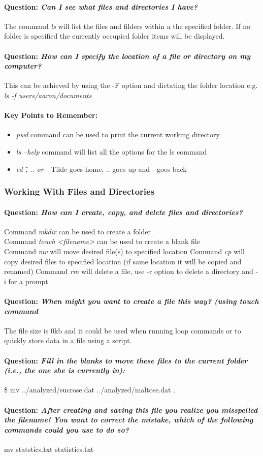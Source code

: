 \documentclass[12pt]{article}
\newcommand{\remember}{\paragraph{Key Points to Remember:}}
\newcommand{\question}[1]{\paragraph{Question: {\textnormal{\textit{#1}}} ~\\}}
\begin{document}
\question{Can I see what files and directories I have?}
The command \textit{ls} will list the files and filders within a the specified folder. If no folder is specified the currently occupied folder items will be displayed.

\question{How can I specify the location of a file or directory on my computer?}
This can be achieved by using the -F option and dictating the folder location e.g. \textit{ls -f users/aaron/documents}

\remember
\begin{itemize}
    \item \textit{pwd} command can be used to print the current working directory
    \item \textit{ls --help} command will list all the options for the ls command
    \item \textit{cd \~, .. or -} Tilde goes home, .. goes up and - goes back
    
\end{itemize}

\subsubsection{Working With Files and Directories}

\question{How can I create, copy, and delete files and directories?}
Command \textit{mkdir} can be used to create a folder \\
Command \textit{touch <filename>} can be used to create a blank file \\
Command \textit{mv} will move desired file(s) to specified location
Command \textit{cp} will copy desired files to specified location (if same location it will be copied and renamed)
Command \textit{rm} will delete a file, use -r option to delete a directory and -i for a prompt

\question{When might you want to create a file this way? (using touch command}
The file size is 0kb and it could be used when running loop commands or to quickly store data in a file using a script.

\question{Fill in the blanks to move these files to the current folder (i.e., the one she is currently in):}
\$ mv ../analyzed/sucrose.dat ../analyzed/maltose.dat .

\question{After creating and saving this file you realize you misspelled the filename! You want to correct the mistake, which of the following commands could you use to do so?}
mv statstics.txt statistics.txt
\end{document}
